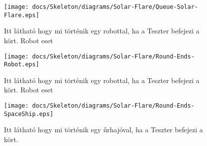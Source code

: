 \begin{figure}[H] 
    \centering 
    \texttt{[image: docs/Skeleton/diagrams/Solar-Flare/Queue-Solar-Flare.eps]} 
    \caption{Itt látható hogy mi történik egy robottal, ha a Teszter befejezi a kört. Robot eset} 
\end{figure}

\begin{figure}[H] 
    \centering 
    \texttt{[image: docs/Skeleton/diagrams/Solar-Flare/Round-Ends-Robot.eps]} 
    \caption{Itt látható hogy mi történik egy robottal, ha a Teszter befejezi a kört. Robot eset} 
\end{figure}

\begin{figure}[H] 
    \centering 
    \texttt{[image: docs/Skeleton/diagrams/Solar-Flare/Round-Ends-SpaceShip.eps]} 
    \caption{Itt látható hogy mi történik egy űrhajóval, ha a Teszter befejezi a kört.} 
\end{figure}


